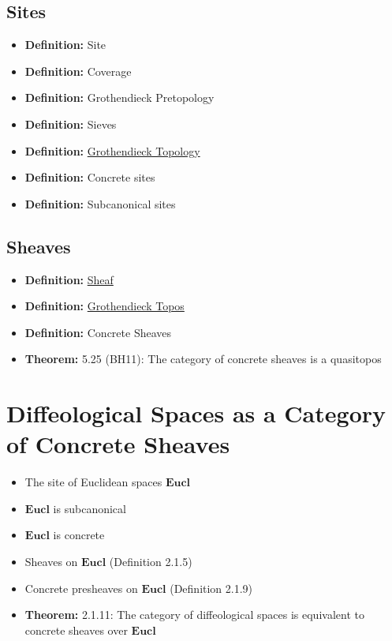 \documentclass[a4paper,11pt,fleqn]{article}  %
\begin{document}
\subsection{Sites}
\begin{itemize}
    \item \textbf{Definition:} Site
    \item \textbf{Definition:} Coverage
    \item \textbf{Definition:} Grothendieck Pretopology
    \item \textbf{Definition:} Sieves
    \item \textbf{Definition:} \href{https://ncatlab.org/nlab/show/Grothendieck+topology#original_definition}{Grothendieck Topology}
    \item \textbf{Definition:} Concrete sites
    \item \textbf{Definition:} Subcanonical sites
\end{itemize}

\subsection{Sheaves}
\begin{itemize}
    \item \textbf{Definition:} \href{https://ncatlab.org/nlab/show/sheaf#GeneralDefinitionAbstractly}{Sheaf}
    \item \textbf{Definition:} \href{https://ncatlab.org/nlab/show/Grothendieck+topos}{Grothendieck Topos}
    \item \textbf{Definition:} Concrete Sheaves
    \item \textbf{Theorem:} 5.25 (BH11): The category of concrete sheaves is a quasitopos
\end{itemize}

\section{ Diffeological Spaces as a Category of Concrete Sheaves}
\begin{itemize}
    \item The site of Euclidean spaces $\textbf{Eucl}$
    \item $\textbf{Eucl}$ is subcanonical
    \item $\textbf{Eucl}$ is concrete
    \item Sheaves on $\textbf{Eucl}$ (Definition 2.1.5)
    \item Concrete presheaves on $\textbf{Eucl}$ (Definition 2.1.9)
    \item \textbf{Theorem:} 2.1.11: The category of diffeological spaces is equivalent to concrete sheaves over $\textbf{Eucl}$
\end{itemize}
\end{document}
